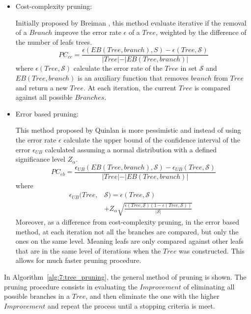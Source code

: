 \begin{itemize}
\item Cost-complexity pruning:
  
Initially proposed by Breiman  \citep{Breiman1984a}, this method evaluate iterative if the removal 
of a $Branch$ improve the error rate $\epsilon$ of a $Tree$, weighted by the difference of the 
number of leafs trees.
\begin{equation}\label{eq:7:pruning}
PC_{cc} = \frac{\epsilon(EB(Tree,branch),S)-\epsilon(Tree,\mathcal{S}) }
{\vert Tree\vert-\vert EB(Tree,branch)\vert}
\end{equation} 
where $\epsilon(Tree,\mathcal{S})$ calculate the error rate of the $Tree$ in set $\mathcal{S}$ and 
$EB(Tree,branch)$ is an auxiliary function that removes $branch$ from $Tree$ and return a new 
$Tree$. At each iteration, the current $Tree$ is compared against all possible $Branches$.
    
\item Error based pruning:
  
This method proposed by Quinlan  \citep{Quinlan1992} is more pessimistic and instead of  using the 
error rate $\epsilon$ calculate the upper bound of the confidence interval   of the error 
$\epsilon_{UB}$ calculated assuming a normal distribution with a defined significance level 
$Z_\alpha$.
\begin{equation}
PC_{eb} = \frac{\epsilon_{UB}(EB(Tree,branch),\mathcal{S})-\epsilon_{UB}(Tree,\mathcal{S}) }
    {\vert Tree\vert-\vert EB(Tree,branch)\vert}
\end{equation} 
where 
\begin{align}
    \epsilon_{UB}(Tree,&\mathcal{S})= \epsilon(Tree,\mathcal{S}) & \nonumber \\
    &+Z_\alpha \sqrt{  
\frac{\epsilon(Tree,\mathcal{S})(1-\epsilon(Tree,\mathcal{S}))}{\vert \mathcal{S} \vert}} &
\end{align}   
Moreover, as a difference from cost-complexity pruning, in the error based method, at each 
iteration not all the branches are compared, but only the ones on the same level. Meaning leafs 
are only compared against other leafs that are in the same level of iterations when the $Tree$ 
was constructed. This allows for much faster pruning procedure.
\end{itemize}

In Algorithm~\ref{alg:7:tree_pruning}, the general method of pruning is shown. The pruning 
procedure consists in evaluating the $Improvement$ of eliminating all possible branches in a $Tree$, 
and then eliminate the one with the higher $Improvement$ and repeat the process until a stopping 
criteria is meet.


